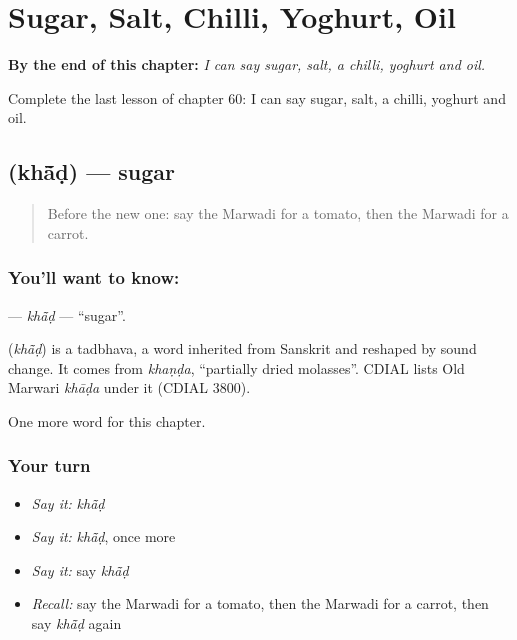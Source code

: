 
\chapter{Sugar, Salt, Chilli, Yoghurt, Oil}
\label{ch:mw-sugar-salt-chilli-yoghurt-oil}

\begin{chapteropening}
\textbf{By the end of this chapter:} \emph{I can say sugar, salt, a chilli, yoghurt and oil.}

Complete the last lesson of chapter 60: I can say sugar, salt, a chilli, yoghurt and oil.
\end{chapteropening}

\section[\texorpdfstring{\mw{खांड} (khā̃ḍ)}{खांड (khā̃ḍ)}]{ (khā̃ḍ) — sugar}

\label{lesson:MW-C60-khad}



\begin{quote}
Before the new one: say the Marwadi for a tomato, then the Marwadi for a carrot.
\end{quote}

\subsection*{You'll want to know: }
\textbf{} — \emph{khā̃ḍ} — \textquotedblleft{}sugar\textquotedblright{}.

\begin{cousinweb}
\textbf{} (\emph{khā̃ḍ}) is a tadbhava, a word inherited from Sanskrit and reshaped by sound change. It comes from \emph{khaṇḍa}, \textquotedblleft{}partially dried molasses\textquotedblright{}. CDIAL lists Old Marwari \emph{khāḍa} under it (CDIAL 3800).
\end{cousinweb}

\begin{grammarlens}[title={What you've built}]
One more word for this chapter.
\end{grammarlens}

\subsection*{Your turn}
\begin{itemize}
\raggedright
  \item \emph{Say it:} \emph{khā̃ḍ}
  \item \emph{Say it:} \emph{khā̃ḍ}, once more
  \item \emph{Say it:} say \emph{khā̃ḍ}
  \item \emph{Recall:} say the Marwadi for a tomato, then the Marwadi for a carrot, then say \emph{khā̃ḍ} again
\end{itemize}

